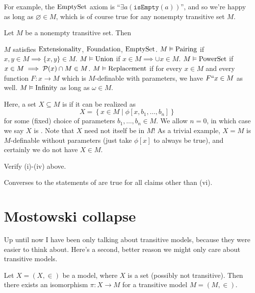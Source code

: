 For example, the $\mathrm{EmptySet}$ axiom is ``$\exists a (\mathtt{isEmpty}(a))$'',
and so we're happy as long as $\varnothing \in M$, which is of course
true for any nonempty transitive set $M$.

\begin{lemma}
	\label{lem:transitive_ZFC}
	Let $M$ be a nonempty transitive set. Then
	\begin{enumerate}[(i)]
		\ii $M$ satisfies $\mathrm{Extensionality}$, $\mathrm{Foundation}$, $\mathrm{EmptySet}$.
		\ii $M \vDash \mathrm{Pairing}$ if $x,y \in M \implies \{x,y\} \in M$.
		\ii $M \vDash \mathrm{Union}$ if $x \in M \implies \cup x \in M$.
		\ii $M \vDash \mathrm{PowerSet}$ if $x \in M \implies \mathcal P(x) \cap M \in M$.
		\ii $M \vDash \mathrm{Replacement}$ if for every $x \in M$
		and every function $F : x \to M$
		which is $M$-definable with parameters,
		we have $F``x \in M$ as well.
		\ii $M \vDash \mathrm{Infinity}$ as long as $\omega \in M$.
	\end{enumerate}
\end{lemma}
Here, a set $X \subseteq M$ is 
if it can be realized as
\[ X = \left\{ x \in M \mid \phi[x, b_1, \dots, b_n] \right\} \]
for some (fixed) choice of parameters $b_1,\dots,b_n \in M$.
We allow $n=0$, in which case we say $X$ is .
Note that $X$ need not itself be in $M$!
As a trivial example, $X = M$ is $M$-definable without parameters
(just take $\phi[x]$ to always be true), and certainly we do not have $X \in M$.
\begin{exercise}
	Verify (i)-(iv) above.
\end{exercise}
\begin{remark}
	Converses to the statements of 
	are true for all claims other than (vi).
\end{remark}

\section{Mostowski collapse}
Up until now I have been only talking about transitive models,
because they were easier to think about.
Here's a second, better reason we might only care about transitive models.

\begin{lemma}
	Let $X = (X, \in)$ be a model,
	where $X$ is a set (possibly not transitive).
	Then there exists an isomorphism $\pi \colon X \to M$ for
	a transitive model $M = (M,\in)$.
\end{lemma}

